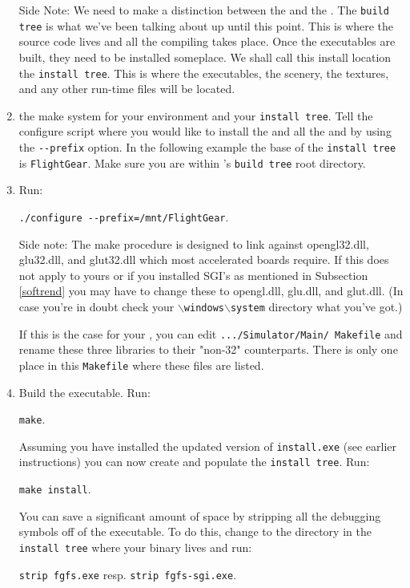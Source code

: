\begin{enumerate}
Side Note: We need to make a distinction between the
\texttt{} and the \texttt{}.
The \texttt{build tree} is what we've been talking about up until
this point.  This is where the source code lives and all the
compiling takes place.  Once the executables are built, they need
to be installed someplace.  We shall call this install location
the \texttt{install tree}.  This is where the executables, the
scenery, the textures, and any other run-time files will be
located.

\item {} the make system for your environment and your
\texttt{install tree}. Tell the configure script where you would like to install the
 and all the  and  by using the
\texttt{-$\!$-prefix} option. In the following example the base of the \texttt{install
tree} is \texttt{FlightGear}. Make sure you are within \FlightGear's \texttt{build tree}
root directory.

\item Run:

        \texttt{./configure -$\!$-prefix=/mnt/FlightGear}.

 \noindent
Side note: The make procedure is designed to link against opengl32.dll, glu32.dll, and
glut32.dll which most accelerated boards require. If this does not apply to yours or if
you installed SGI's  as mentioned in Subsection \ref{softrend}
you may have to change these to opengl.dll, glu.dll, and glut.dll. (In case you're in
doubt check your \texttt{$\backslash$windows$\backslash$system} directory what you've
got.)

 If this is the case for your , you can edit
 \texttt{.../Simulator/Main/ Makefile} and rename these three libraries to
    their "non-32" counterparts.  There is only one place in this
    \texttt{Makefile} where these files are listed.

\item Build the executable.  Run:

        \texttt{make}.

Assuming you have installed the updated version of \texttt{install.exe} (see earlier
instructions) you can now create and populate the \texttt{install tree}.  Run:

        \texttt{make install}.

    You can save a significant amount of space by stripping all the
    debugging symbols off of the executable.  To do this, change to the
    directory in the \texttt{install tree} where your binary lives and run:

        \texttt{strip fgfs.exe} resp. \texttt{strip fgfs-sgi.exe}.

\end{enumerate}


